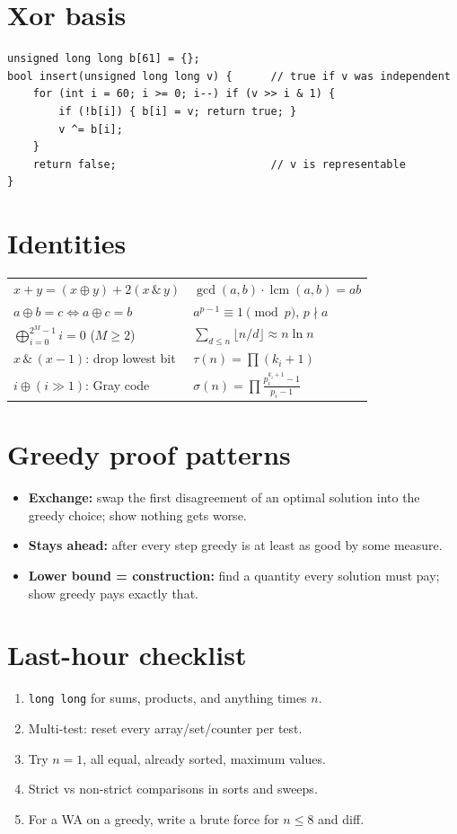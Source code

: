 \section*{Xor basis}
\begin{lstlisting}
unsigned long long b[61] = {};
bool insert(unsigned long long v) {      // true if v was independent
    for (int i = 60; i >= 0; i--) if (v >> i & 1) {
        if (!b[i]) { b[i] = v; return true; }
        v ^= b[i];
    }
    return false;                        // v is representable
}
\end{lstlisting}

\section*{Identities}
\begin{center}
\renewcommand{\arraystretch}{1.3}
\begin{tabular}{ll}
\toprule
$x+y=(x\oplus y)+2(x\,\&\,y)$ & $\gcd(a,b)\cdot\operatorname{lcm}(a,b)=ab$\\
$a\oplus b=c\iff a\oplus c=b$ & $a^{p-1}\equiv1\pmod p$, $p\nmid a$\\
$\bigoplus_{i=0}^{2^M-1}i=0$ ($M\ge2$) & $\sum_{d\le n}\lfloor n/d\rfloor\approx n\ln n$\\
$x\,\&\,(x-1)$: drop lowest bit & $\tau(n)=\prod(k_i+1)$\\
$i\oplus(i\gg1)$: Gray code & $\sigma(n)=\prod\frac{p_i^{k_i+1}-1}{p_i-1}$\\
\bottomrule
\end{tabular}
\end{center}

\section*{Greedy proof patterns}
\begin{itemize}
  \item \textbf{Exchange:} swap the first disagreement of an optimal solution
        into the greedy choice; show nothing gets worse.
  \item \textbf{Stays ahead:} after every step greedy is at least as good by
        some measure.
  \item \textbf{Lower bound = construction:} find a quantity every solution
        must pay; show greedy pays exactly that.
\end{itemize}

\section*{Last-hour checklist}
\begin{enumerate}
  \item \texttt{long long} for sums, products, and anything times $n$.
  \item Multi-test: reset every array/set/counter per test.
  \item Try $n=1$, all equal, already sorted, maximum values.
  \item Strict vs non-strict comparisons in sorts and sweeps.
  \item For a WA on a greedy, write a brute force for $n\le8$ and diff.
\end{enumerate}
